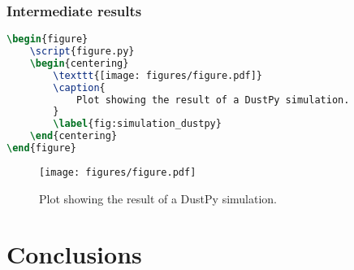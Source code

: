 \documentclass{aa}
\begin{document}
\subsubsection{Intermediate results}

\begin{lstlisting}[language=TeX]
\begin{figure}
    \script{figure.py}
    \begin{centering}
        \texttt{[image: figures/figure.pdf]}
        \caption{
            Plot showing the result of a DustPy simulation.
        }
        \label{fig:simulation_dustpy}
    \end{centering}
\end{figure}
\end{lstlisting}

\begin{figure}
    \begin{centering}
        \texttt{[image: figures/figure.pdf]}
        \caption{
            Plot showing the result of a DustPy simulation.
        }
        \label{fig:simulation_dustpy}
    \end{centering}
\end{figure}

\section{Conclusions}

\begin{acknowledgements}
\end{acknowledgements}

\end{document}
